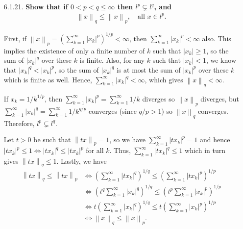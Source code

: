 \documentclass[a4paper,12pt]{article}
\newcommand{\norm}[1]{\left\lVert#1\right\rVert}
\begin{document}
\begin{enumerate}
    \item[6.1.21.]
        \boldmath\textbf{Show that if $0 < p < q \leq \infty$ then $l^p \subsetneq l^q$, and
            \begin{align*}
                \norm{x}_q \leq \norm{x}_p, \quad \text{all }x \in l^p.
            \end{align*}
        }\unboldmath \par
        First, if $\norm{x}_p = \left( \sum_{k = 1}^\infty |x_k|^p \right)^{1/p} < \infty$, then $\sum_{k = 1}^\infty |x_k|^p < \infty$ also. This implies the existence of only a finite number of $k$ such that $|x_k| \geq 1$, so the sum of $|x_k|^q$ over these $k$ is finite. Also, for any $k$ such that $|x_k| < 1$, we know that $|x_k|^q < |x_k|^p$, so the sum of $|x_k|^q$ is at most the sum of $|x_k|^p$ over these $k$ which is finite as well. Hence, $\sum_{k = 1}^\infty |x_k|^q < \infty$, which gives $\norm{x}_q < \infty$. \par
        If $x_k = 1/k^{1/p}$, then $\sum_{k = 1}^\infty |x_k|^p = \sum_{k = 1}^\infty 1/k$ diverges so $\norm{x}_p$ diverges, but $\sum_{k = 1}^\infty |x_k|^q = \sum_{k = 1}^\infty 1/k^{q/p}$ converges (since $q/p > 1$) so $\norm{x}_q$ converges. Therefore, $l^p \subsetneq l^q$. \par
        Let $t > 0$ be such that $\norm{tx}_p = 1$, so we have $\sum_{k = 1}^\infty |tx_k|^p = 1$ and hence $|tx_k|^p \leq 1 \Leftrightarrow |tx_k|^q \leq |tx_k|^p$ for all $k$. Thus, $\sum_{k = 1}^\infty |tx_k|^q \leq 1$ which in turn gives $\norm{tx}_q \leq 1$. Lastly, we have
        \begin{align*}
            \norm{tx}_q \leq \norm{tx}_p
            &\Leftrightarrow \left( \sum_{k = 1}^\infty |tx_k|^q \right)^{1/q} \leq \left( \sum_{k = 1}^\infty |tx_k|^p \right)^{1/p} \\
            &\Leftrightarrow \left( t^q\sum_{k = 1}^\infty |x_k|^q \right)^{1/q} \leq \left( t^p\sum_{k = 1}^\infty |x_k|^p \right)^{1/p} \\
            &\Leftrightarrow t\left( \sum_{k = 1}^\infty |x_k|^q \right)^{1/q} \leq t\left( \sum_{k = 1}^\infty |x_k|^p \right)^{1/p} \\
            &\Leftrightarrow \norm{x}_q \leq \norm{x}_p.
        \end{align*}


\end{enumerate}
\end{document}
